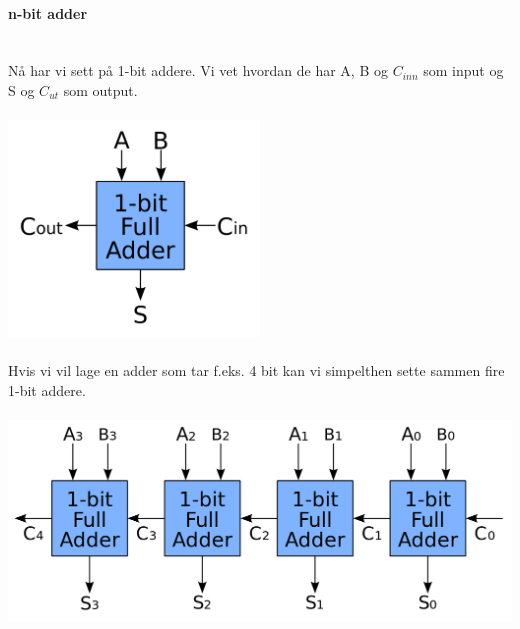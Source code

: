 \paragraph{n-bit adder} \mbox{} \\
Nå har vi sett på 1-bit addere.
Vi vet hvordan de har A, B og $C_{inn}$ som input og S og $C_{ut}$ som output.
\\\\
\includegraphics[width=0.5\textwidth]{./img/1bit-adder}
\\\\
Hvis vi vil lage en adder som tar f.eks. 4 bit kan vi simpelthen sette sammen
fire 1-bit addere.
\\\\
\includegraphics[width=\textwidth]{./img/4bit-adder}
